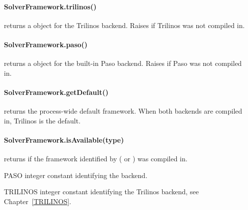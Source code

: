 \paragraph{SolverFramework.trilinos()}
returns a  object for the Trilinos backend.
Raises  if Trilinos was not compiled in.

\paragraph{SolverFramework.paso()}
returns a  object for the built-in Paso backend.
Raises  if Paso was not compiled in.

\paragraph{SolverFramework.getDefault()}
returns the process-wide default framework.
When both backends are compiled in, Trilinos is the default.

\paragraph{SolverFramework.isAvailable(type)}
returns \True if the framework identified by 
( or ) was
compiled in.

\begin{memberdesc}[SolverFramework]{PASO}
integer constant identifying the \PASO backend.
\end{memberdesc}

\begin{memberdesc}[SolverFramework]{TRILINOS}
integer constant identifying the Trilinos backend, see Chapter~\ref{TRILINOS}.
\end{memberdesc}


